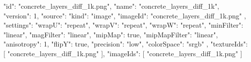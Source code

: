{
  "id": "concrete_layers_diff_1k.png",
  "name": "concrete_layers_diff_1k",
  "version": 1,
  "source": {
    "kind": "image",
    "imageId": "concrete_layers_diff_1k.png"
  },
  "settings": {
    "wrapU": "repeat",
    "wrapV": "repeat",
    "wrapW": "repeat",
    "minFilter": "linear",
    "magFilter": "linear",
    "mipMap": true,
    "mipMapFilter": "linear",
    "anisotropy": 1,
    "flipY": true,
    "precision": "low",
    "colorSpace": "srgb"
  },
  "textureIds": [
    "concrete_layers_diff_1k.png"
  ],
  "imageIds": [
    "concrete_layers_diff_1k.png"
  ]
}
